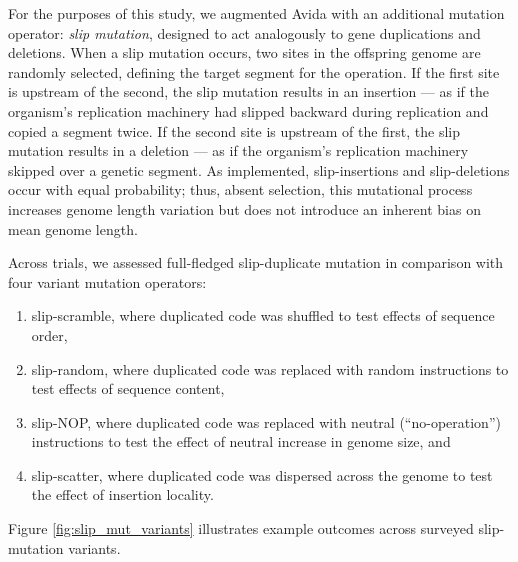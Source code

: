 For the purposes of this study, we augmented Avida with an additional mutation operator: \textit{slip mutation}, designed to act analogously to gene duplications and deletions.
When a slip mutation occurs, two sites in the offspring genome are randomly selected, defining the target segment for the operation.
If the first site is upstream of the second, the slip mutation results in an insertion --- as if the organism's replication machinery had slipped backward during replication and copied a segment twice.
If the second site is upstream of the first, the slip mutation results in a deletion --- as if the organism's replication machinery skipped over a genetic segment.
As implemented, slip-insertions and slip-deletions occur with equal probability; thus, absent selection, this mutational process increases genome length variation but does not introduce an inherent bias on mean genome length.

Across trials, we assessed full-fledged slip-duplicate mutation in comparison with four variant mutation operators:
\begin{enumerate}
\item slip-scramble, where duplicated code was shuffled to test effects of sequence order,
\item slip-random, where duplicated code was replaced with random instructions to test effects of sequence content,
\item slip-NOP, where duplicated code was replaced with neutral (``no-operation'') instructions to test the effect of neutral increase in genome size, and
\item slip-scatter, where duplicated code was dispersed across the genome to test the effect of insertion locality.
\end{enumerate}
Figure \ref{fig:slip_mut_variants} illustrates example outcomes across surveyed slip-mutation variants.

